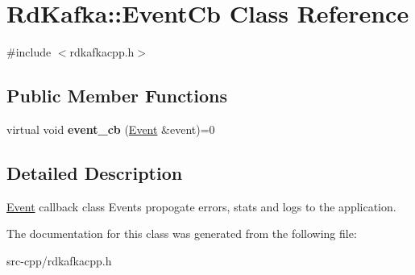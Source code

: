 \hypertarget{classRdKafka_1_1EventCb}{\section{Rd\-Kafka\-:\-:Event\-Cb Class Reference}
\label{classRdKafka_1_1EventCb}
}


{\ttfamily \#include $<$rdkafkacpp.\-h$>$}

\subsection*{Public Member Functions}
\begin{DoxyCompactItemize}
\item 
\hypertarget{classRdKafka_1_1EventCb_adc63c5b7747a12cc34f8b57819d17037}{virtual void {\bfseries event\-\_\-cb} (\hyperlink{classRdKafka_1_1Event}{Event} \&event)=0}\label{classRdKafka_1_1EventCb_adc63c5b7747a12cc34f8b57819d17037}

\end{DoxyCompactItemize}


\subsection{Detailed Description}
\hyperlink{classRdKafka_1_1Event}{Event} callback class Events propogate errors, stats and logs to the application. 

The documentation for this class was generated from the following file\-:\begin{DoxyCompactItemize}
\item 
src-\/cpp/rdkafkacpp.\-h\end{DoxyCompactItemize}
